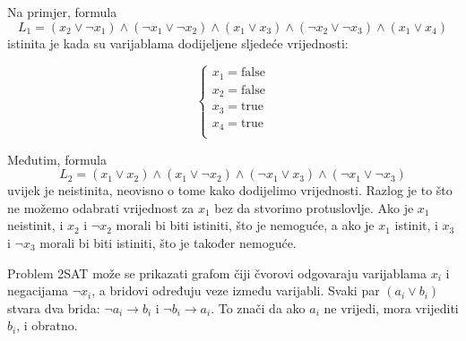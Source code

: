 Na primjer, formula
\[
L_1 = (x_2 \lor \lnot x_1) \land
      (\lnot x_1 \lor \lnot x_2) \land
      (x_1 \lor x_3) \land
      (\lnot x_2 \lor \lnot x_3) \land
      (x_1 \lor x_4)
\]
istinita je kada su varijablama dodijeljene sljedeće vrijednosti:

\[
\begin{cases}
x_1 = \textrm{false} \\
x_2 = \textrm{false} \\
x_3 = \textrm{true} \\
x_4 = \textrm{true} \\
\end{cases}
\]

Međutim, formula
\[
L_2 = (x_1 \lor x_2) \land
      (x_1 \lor \lnot x_2) \land
      (\lnot x_1 \lor x_3) \land
      (\lnot x_1 \lor \lnot x_3)
\]
uvijek je neistinita, neovisno o tome kako
dodijelimo vrijednosti.
Razlog je to što ne možemo
odabrati vrijednost za $x_1$
bez da stvorimo protuslovlje.
Ako je $x_1$ neistinit, i $x_2$ i $\lnot x_2$
morali bi biti istiniti, što je nemoguće,
a ako je $x_1$ istinit, i $x_3$ i $\lnot x_3$
morali bi biti istiniti, što je također nemoguće.

Problem 2SAT može se prikazati grafom
čiji čvorovi odgovaraju
varijablama $x_i$ i negacijama $\lnot x_i$,
a bridovi određuju veze
između varijabli.
Svaki par $(a_i \lor b_i)$ stvara dva brida:
$\lnot a_i \to b_i$ i $\lnot b_i \to a_i$.
To znači da ako $a_i$ ne vrijedi,
mora vrijediti $b_i$, i obratno.

